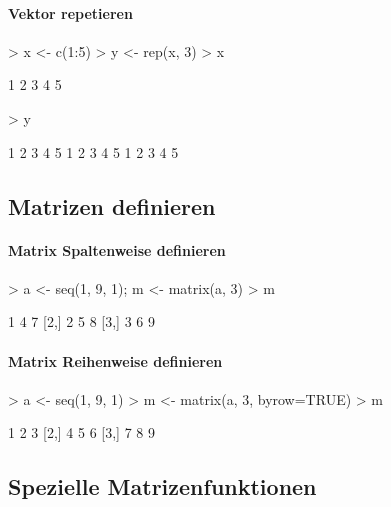 \paragraph{Vektor repetieren}
\begin{Schunk}
\begin{Sinput}
> x <- c(1:5)
> y <- rep(x, 3)
> x
\end{Sinput}
\begin{Soutput}
[1] 1 2 3 4 5
\end{Soutput}
\begin{Sinput}
> y
\end{Sinput}
\begin{Soutput}
 [1] 1 2 3 4 5 1 2 3 4 5 1 2 3 4 5
\end{Soutput}
\end{Schunk}

\subsection{Matrizen definieren}

\paragraph{Matrix Spaltenweise definieren}
\begin{Schunk}
\begin{Sinput}
> a <- seq(1, 9, 1); m <- matrix(a, 3)
> m
\end{Sinput}
\begin{Soutput}
     [,1] [,2] [,3]
[1,]    1    4    7
[2,]    2    5    8
[3,]    3    6    9
\end{Soutput}
\end{Schunk}

\paragraph{Matrix Reihenweise definieren}
\begin{Schunk}
\begin{Sinput}
> a <- seq(1, 9, 1)
> m <- matrix(a, 3, byrow=TRUE)
> m
\end{Sinput}
\begin{Soutput}
     [,1] [,2] [,3]
[1,]    1    2    3
[2,]    4    5    6
[3,]    7    8    9
\end{Soutput}
\end{Schunk}

\subsection{Spezielle Matrizenfunktionen}

